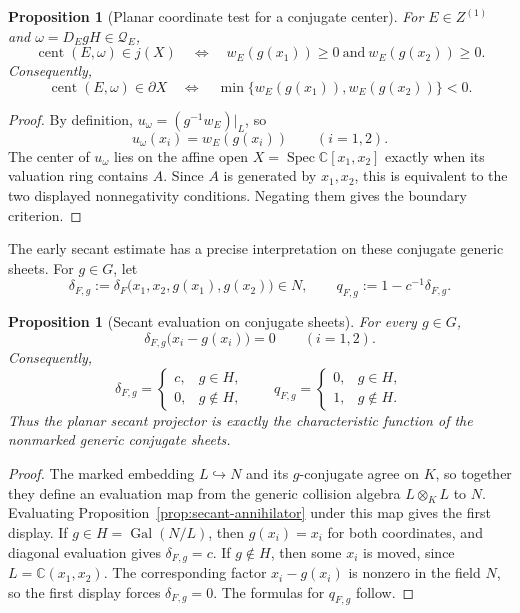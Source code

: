 \documentclass[11pt]{article}
\newtheorem{proposition}[theorem]{Proposition}
\theoremstyle{remark}
\theoremstyle{definition}
\DeclareMathOperator{\Spec}{Spec}
\DeclareMathOperator{\Gal}{Gal}
\newcommand{\C}{\mathbb C}
\begin{document}
\begin{proposition}[Planar coordinate test for a conjugate center]
\label{prop:planar-conjugate-coordinate-test}
For \(E\in Z^{(1)}\) and \(\omega=D_EgH\in\mathcal Q_E\),
\[
  \operatorname{cent}(E,\omega)\in j(X)
  \quad\Longleftrightarrow\quad
  w_E(g(x_1))\geq0
  \ \text{and}\
  w_E(g(x_2))\geq0.
\]
Consequently,
\[
  \operatorname{cent}(E,\omega)\in\partial X
  \quad\Longleftrightarrow\quad
  \min\{w_E(g(x_1)),w_E(g(x_2))\}<0.
\]
\end{proposition}

\begin{proof}
By definition,
\(u_\omega=(g^{-1}w_E)|_L\), so
\[
  u_\omega(x_i)=w_E(g(x_i))
  \qquad(i=1,2).
\]
The center of \(u_\omega\) lies on the affine open
\(X=\Spec\C[x_1,x_2]\) exactly when its valuation ring contains
\(A\).  Since \(A\) is generated by \(x_1,x_2\), this is equivalent to
the two displayed nonnegativity conditions.  Negating them gives the
boundary criterion.
\end{proof}

The early secant estimate has a precise interpretation on these conjugate
generic sheets.  For \(g\in G\), let
\[
  \delta_{F,g}
  :=
  \delta_F\bigl(x_1,x_2,g(x_1),g(x_2)\bigr)\in N,
  \qquad
  q_{F,g}:=1-c^{-1}\delta_{F,g}.
\]

\begin{proposition}[Secant evaluation on conjugate sheets]
\label{prop:secant-conjugate-evaluation}
For every \(g\in G\),
\[
  \delta_{F,g}\bigl(x_i-g(x_i)\bigr)=0
  \qquad(i=1,2).
\]
Consequently,
\[
  \delta_{F,g}
  =
  \begin{cases}
    c,&g\in H,\\
    0,&g\notin H,
  \end{cases}
  \qquad
  q_{F,g}
  =
  \begin{cases}
    0,&g\in H,\\
    1,&g\notin H.
  \end{cases}
\]
Thus the planar secant projector is exactly the characteristic function of
the nonmarked generic conjugate sheets.
\end{proposition}

\begin{proof}
The marked embedding \(L\hookrightarrow N\) and its \(g\)-conjugate agree
on \(K\), so together they define an evaluation map from the generic
collision algebra \(L\otimes_KL\) to \(N\).  Evaluating
Proposition~\ref{prop:secant-annihilator} under this map gives the first
display.  If \(g\in H=\Gal(N/L)\), then \(g(x_i)=x_i\) for both coordinates,
and diagonal evaluation gives \(\delta_{F,g}=c\).  If \(g\notin H\), then
some \(x_i\) is moved, since \(L=\C(x_1,x_2)\).  The corresponding factor
\(x_i-g(x_i)\) is nonzero in the field \(N\), so the first display forces
\(\delta_{F,g}=0\).  The formulas for \(q_{F,g}\) follow.
\end{proof}
\end{document}
